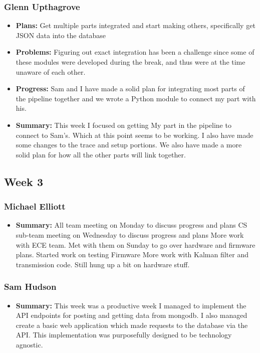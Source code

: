 \documentclass[onecolumn, draftclsnofoot,10pt, compsoc]{IEEEtran}
\begin{document}
\subsubsection{Glenn Upthagrove}
\begin {itemize}
 \item \textbf{Plans: }Get multiple parts integrated and start making others, specifically get JSON data into the database 
 \item \textbf{Problems: }Figuring out exact integration has been a challenge since some of these modules were developed during the break, and thus were at the time unaware of each other. 
 \item \textbf{Progress: }Sam and I have made a solid plan for integrating most parts of the pipeline together and we wrote a Python module to connect my part with his.
 \item \textbf{Summary: }This week I focused on getting My part in the pipeline to connect to Sam's. Which at this point seems to be working. I also have made some changes to the trace and setup portions. We also have made a more solid plan for how all the other parts will link together.  
\end {itemize}
\subsection {Week 3}
\subsubsection{Michael Elliott}
\begin {itemize}
\item \textbf{Summary: }
All team meeting on Monday to discuss progress and plans
CS sub-team meeting on Wednesday to discuss progress and plans
More work with ECE team. Met with them on Sunday to go over hardware
and firmware plans.
Started work on testing
Firmware
More work with Kalman filter and transmission code. Still hung up a
bit on hardware stuff.
\end {itemize}
\subsubsection{Sam Hudson}
\begin {itemize}
\item \textbf{Summary: }This week was a productive week I managed to implement the API endpoints for posting and getting data from mongodb. I also managed create a basic web application which made requests to the database via the API. This implementation was purposefully designed to be technology agnostic.
\end {itemize}
\end{document}
